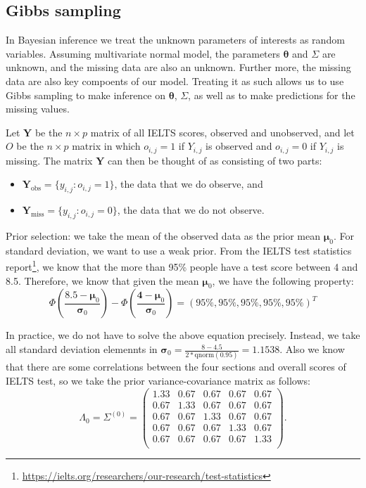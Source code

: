 \documentclass[12pt]{article}
\begin{document}
\subsection{Gibbs sampling}
\label{Gibbs}

In Bayesian inference we treat the unknown parameters of interests as random variables. Assuming multivariate normal model, the parameters $\boldsymbol{\theta}$ and $\Sigma$ are unknown, and the missing data are also an unknown. Further more, the missing data are also key compoents of our model. 
Treating it as such allows us to use Gibbs sampling to make inference on $\boldsymbol{\theta}$, $\Sigma$, as well as to make predictions for the missing values.\cite{Hoff2009}

Let $\mathbf{Y}$ be the $n\times p$ matrix of all IELTS scores, observed and unobserved, and let $O$ be the $n \times p$ matrix in which $o_{i,j} = 1$ if $Y_{i,j}$ is observed and $o_{i,j} = 0$ if $Y_{i,j}$ is missing. The matrix $\mathbf{Y}$ can then be thought of as consisting of two parts:

\begin{itemize}
\item $\mathbf{Y}_{\text{obs}} = \{y_{i,j}: o_{i,j} = 1\}$, the data that we do observe, and
\item $\mathbf{Y}_{\text{miss}} = \{y_{i,j}: o_{i,j} = 0\}$, the data that we do not observe.
\end{itemize}

Prior selection: we take the mean of the observed data as the prior mean $\boldsymbol{\mu}_0$. For standard deviation, we want to use a weak prior. From the IELTS test statistics report\footnote{\url{https://ielts.org/researchers/our-research/test-statistics}}, we know that the more than 95\% people have a test score between 4 and 8.5. Therefore, we know that given the mean $\boldsymbol{\mu}_0$, we have the following property: 
\[
\Phi(\frac{\mathbf{8.5}-\boldsymbol{\mu}_0}{\boldsymbol{\sigma}_0})-\Phi(\frac{\mathbf{4}-\boldsymbol{\mu}_0}{\boldsymbol{\sigma}_0}) = (95\%,95\%,95\%,95\%,95\%)^{T}
\] 

In practice, we do not have to solve the above equation precisely. Instead, we take all standard deviation elemennts in $\boldsymbol{\sigma}_0 = \frac{8-4.5}{2*\text{qnorm}(0.95)} = 1.1538$. Also we know that there are some correlations between the four sections and overall scores of IELTS test, so we take the prior variance-covariance matrix as follows:
\[
\Lambda_0 = \Sigma^{(0)} = \begin{pmatrix} 
1.33&0.67&0.67&0.67&0.67\\
0.67&1.33&0.67&0.67&0.67\\
0.67&0.67&1.33&0.67&0.67\\
0.67&0.67&0.67&1.33&0.67\\
0.67&0.67&0.67&0.67&1.33\\
\end{pmatrix} 
.\] 
\end{document}
